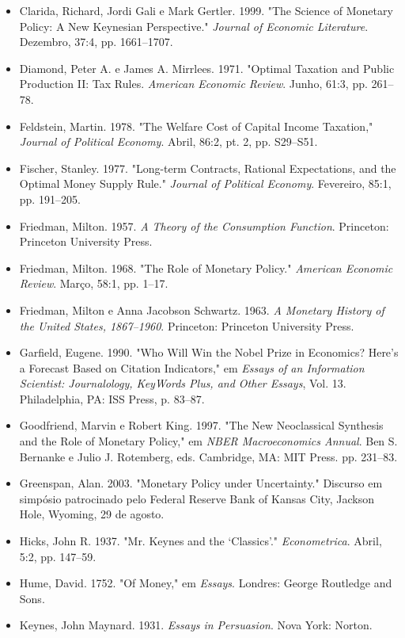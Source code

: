 \documentclass[12pt]{article}
\begin{document}
\begin{itemize}
    \item Clarida, Richard, Jordi Gali e Mark Gertler. 1999. "The Science of Monetary Policy: A New Keynesian Perspective." \textit{Journal of Economic Literature}. Dezembro, 37:4, pp. 1661–1707.
    \item Diamond, Peter A. e James A. Mirrlees. 1971. "Optimal Taxation and Public Production II: Tax Rules. \textit{American Economic Review}. Junho, 61:3, pp. 261–78.
    \item Feldstein, Martin. 1978. "The Welfare Cost of Capital Income Taxation," \textit{Journal of Political Economy}. Abril, 86:2, pt. 2, pp. S29–S51.
    \item Fischer, Stanley. 1977. "Long-term Contracts, Rational Expectations, and the Optimal Money Supply Rule." \textit{Journal of Political Economy}. Fevereiro, 85:1, pp. 191–205.
    \item Friedman, Milton. 1957. \textit{A Theory of the Consumption Function}. Princeton: Princeton University Press.
    \item Friedman, Milton. 1968. "The Role of Monetary Policy." \textit{American Economic Review}. Março, 58:1, pp. 1–17.
    \item Friedman, Milton e Anna Jacobson Schwartz. 1963. \textit{A Monetary History of the United States, 1867–1960}. Princeton: Princeton University Press.
    \item Garfield, Eugene. 1990. "Who Will Win the Nobel Prize in Economics? Here’s a Forecast Based on Citation Indicators," em \textit{Essays of an Information Scientist: Journalology, KeyWords Plus, and Other Essays}, Vol. 13. Philadelphia, PA: ISS Press, p. 83–87.
    \item Goodfriend, Marvin e Robert King. 1997. "The New Neoclassical Synthesis and the Role of Monetary Policy," em \textit{NBER Macroeconomics Annual}. Ben S. Bernanke e Julio J. Rotemberg, eds. Cambridge, MA: MIT Press. pp. 231–83.
    \item Greenspan, Alan. 2003. "Monetary Policy under Uncertainty." Discurso em simpósio patrocinado pelo Federal Reserve Bank of Kansas City, Jackson Hole, Wyoming, 29 de agosto.
    \item Hicks, John R. 1937. "Mr. Keynes and the ‘Classics’." \textit{Econometrica}. Abril, 5:2, pp. 147–59.
    \item Hume, David. 1752. "Of Money," em \textit{Essays}. Londres: George Routledge and Sons.
    \item Keynes, John Maynard. 1931. \textit{Essays in Persuasion}. Nova York: Norton.

\end{itemize}
\end{document}
